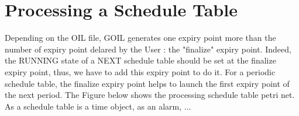 \section{Processing a Schedule Table}

Depending on the OIL file, GOIL generates one expiry point more than the number of expiry point delared by the User : the "finalize" expiry point. Indeed, the RUNNING state of a NEXT schedule table should be set at the finalize expiry point, thus, we have to add this expiry point to do it. For a periodic schedule table, the finalize expiry point helps to launch the first expiry point of the next period. The Figure below shows the processing schedule table petri net. \\%

As a schedule table is a time object, as an alarm, ...\\































